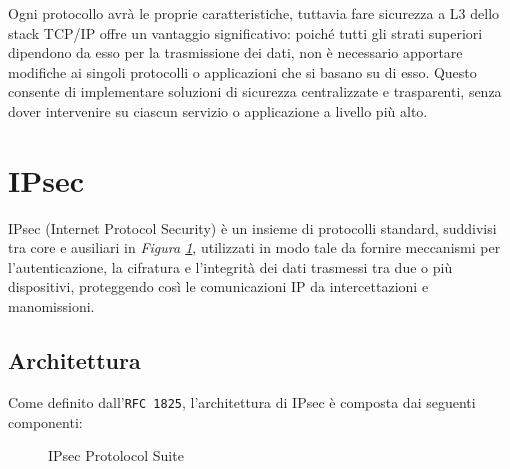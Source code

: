 \noindent
Ogni protocollo avrà le proprie caratteristiche, tuttavia fare sicurezza a L3 dello stack TCP/IP offre un vantaggio significativo:
poiché tutti gli strati superiori dipendono da esso per la trasmissione dei dati,
non è necessario apportare modifiche ai singoli protocolli o applicazioni che
si basano su di esso. Questo consente di implementare soluzioni di sicurezza
centralizzate e trasparenti, senza dover intervenire su ciascun servizio o
applicazione a livello più alto.



\section{IPsec}

IPsec (Internet Protocol Security) è un insieme di protocolli standard, suddivisi tra core e ausiliari in \textit{Figura \ref{fig:ipsec-suite}}, utilizzati
in modo tale da fornire meccanismi per l'autenticazione, la cifratura e l'integrità dei dati trasmessi tra due o più
dispositivi, proteggendo così le comunicazioni IP da intercettazioni e manomissioni.

\subsection{Architettura}

Come definito dall'\texttt{RFC 1825}, l'architettura di IPsec è composta dai seguenti componenti:

\begin{figure}[!ht] 
    \centering 
    \caption{IPsec Protolocol Suite}
    \label{fig:ipsec-suite} 
\end{figure}

